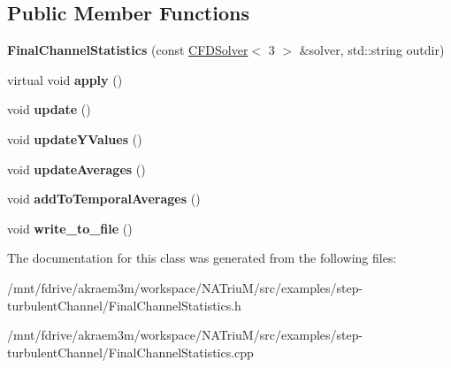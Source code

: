 \subsection*{Public Member Functions}
\begin{DoxyCompactItemize}
\item 
\hypertarget{classnatrium_1_1FinalChannelStatistics_a1fc8613d55b3db6b4af43729e13b600b}{
{\bfseries FinalChannelStatistics} (const \hyperlink{classnatrium_1_1CFDSolver}{CFDSolver}$<$ 3 $>$ \&solver, std::string outdir)}
\label{classnatrium_1_1FinalChannelStatistics_a1fc8613d55b3db6b4af43729e13b600b}

\item 
\hypertarget{classnatrium_1_1FinalChannelStatistics_a3198aefa058cd9789ca614ea3fc5756a}{
virtual void {\bfseries apply} ()}
\label{classnatrium_1_1FinalChannelStatistics_a3198aefa058cd9789ca614ea3fc5756a}

\item 
\hypertarget{classnatrium_1_1FinalChannelStatistics_a20cf4a1f558e61ab6615b664e03cfad4}{
void {\bfseries update} ()}
\label{classnatrium_1_1FinalChannelStatistics_a20cf4a1f558e61ab6615b664e03cfad4}

\item 
\hypertarget{classnatrium_1_1FinalChannelStatistics_ae63b0c6e4f01ef6eb2a302596fe4b7e1}{
void {\bfseries updateYValues} ()}
\label{classnatrium_1_1FinalChannelStatistics_ae63b0c6e4f01ef6eb2a302596fe4b7e1}

\item 
\hypertarget{classnatrium_1_1FinalChannelStatistics_af227e583904c55e0526fdf98cc731be5}{
void {\bfseries updateAverages} ()}
\label{classnatrium_1_1FinalChannelStatistics_af227e583904c55e0526fdf98cc731be5}

\item 
\hypertarget{classnatrium_1_1FinalChannelStatistics_a00601ddd46bfc0562868a19dafc99bca}{
void {\bfseries addToTemporalAverages} ()}
\label{classnatrium_1_1FinalChannelStatistics_a00601ddd46bfc0562868a19dafc99bca}

\item 
\hypertarget{classnatrium_1_1FinalChannelStatistics_a69d3db5b8f1f7211e3379b4a9821c3d6}{
void {\bfseries write\_\-to\_\-file} ()}
\label{classnatrium_1_1FinalChannelStatistics_a69d3db5b8f1f7211e3379b4a9821c3d6}

\end{DoxyCompactItemize}


The documentation for this class was generated from the following files:\begin{DoxyCompactItemize}
\item 
/mnt/fdrive/akraem3m/workspace/NATriuM/src/examples/step-\/turbulentChannel/FinalChannelStatistics.h\item 
/mnt/fdrive/akraem3m/workspace/NATriuM/src/examples/step-\/turbulentChannel/FinalChannelStatistics.cpp\end{DoxyCompactItemize}

